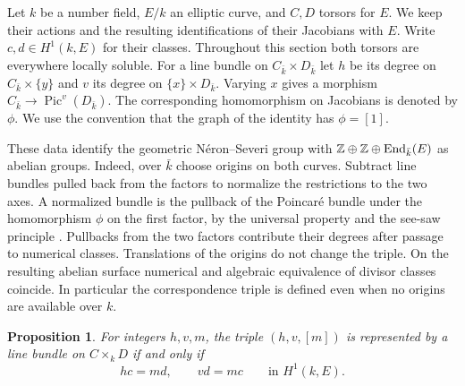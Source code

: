 \documentclass[11pt]{article}
\newtheorem{picproposition}{Proposition}[section]
\newcommand{\Pic}{\operatorname{Pic}}\newcommand{\Sel}{\operatorname{Sel}}\newcommand{\End}{\operatorname{End}}\newcommand{\NS}{\operatorname{NS}}
\begin{document}
Let $k$ be a number field, $E/k$ an elliptic curve, and $C,D$
torsors for $E$. We keep their actions and the resulting identifications
of their Jacobians with $E$. Write $c,d\in H^1(k,E)$ for their classes.
Throughout this section both torsors are everywhere locally soluble.
For a line bundle on $C_{\bar k}\times D_{\bar k}$ let $h$ be its
degree on $C_{\bar k}\times\{y\}$ and $v$ its degree on
$\{x\}\times D_{\bar k}$. Varying $x$ gives a morphism
$C_{\bar k}\to\Pic^v(D_{\bar k})$. The corresponding homomorphism on
Jacobians is denoted by $\phi$. We use the convention that the graph of
the identity has $\phi=[1]$.

These data identify the geometric N\'eron--Severi group with
$\Z\oplus\Z\oplus\End_{\bar k}(E)$ as abelian groups. Indeed, over
$\bar k$ choose origins on both curves. Subtract line bundles pulled back
from the factors to normalize the restrictions to the two axes.
A normalized bundle is the pullback of the Poincar\'e bundle under the
homomorphism $\phi$ on the first factor, by the universal property and
the see-saw principle \cite[\S4.6]{CTS}. Pullbacks from the two factors
contribute their degrees after passage to numerical classes.
Translations of the origins do not change the triple. On the resulting
abelian surface numerical and algebraic equivalence of divisor classes
coincide. In particular the correspondence triple is defined even when no
origins are available over $k$.

\begin{picproposition}\label{prop:scalar}
For integers $h,v,m$, the triple $(h,v,[m])$ is represented by a
line bundle on $C\times_k D$ if and only if
\begin{equation}\label{eq:ob}
             h c=m d,\qquad v d=m c \qquad\text{in }H^1(k,E).
\end{equation}
\end{picproposition}
\end{document}
